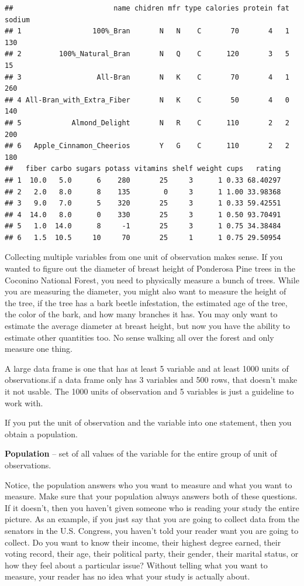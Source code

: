 \documentclass[]{book}
\begin{document}
\begin{verbatim}
##                        name chidren mfr type calories protein fat sodium
## 1                 100%_Bran       N   N    C       70       4   1    130
## 2         100%_Natural_Bran       N   Q    C      120       3   5     15
## 3                  All-Bran       N   K    C       70       4   1    260
## 4 All-Bran_with_Extra_Fiber       N   K    C       50       4   0    140
## 5            Almond_Delight       N   R    C      110       2   2    200
## 6   Apple_Cinnamon_Cheerios       Y   G    C      110       2   2    180
##   fiber carbo sugars potass vitamins shelf weight cups   rating
## 1  10.0   5.0      6    280       25     3      1 0.33 68.40297
## 2   2.0   8.0      8    135        0     3      1 1.00 33.98368
## 3   9.0   7.0      5    320       25     3      1 0.33 59.42551
## 4  14.0   8.0      0    330       25     3      1 0.50 93.70491
## 5   1.0  14.0      8     -1       25     3      1 0.75 34.38484
## 6   1.5  10.5     10     70       25     1      1 0.75 29.50954
\end{verbatim}

Collecting multiple variables from one unit of observation makes sense. If you wanted to figure out the diameter of breast height of Ponderosa Pine trees in the Coconino National Forest, you need to physically measure a bunch of trees. While you are measuring the diameter, you might also want to measure the height of the tree, if the tree has a bark beetle infestation, the estimated age of the tree, the color of the bark, and how many branches it has. You may only want to estimate the average diameter at breast height, but now you have the ability to estimate other quantities too. No sense walking all over the forest and only measure one thing.

A large data frame is one that has at least 5 variable and at least 1000 units of observations.if a data frame only has 3 variables and 500 rows, that doesn't make it not usable. The 1000 units of observation and 5 variables is just a guideline to work with.

If you put the unit of observation and the variable into one statement, then you obtain a population.

\textbf{Population} -- set of all values of the variable for the entire group of unit of observations.

Notice, the population answers who you want to measure and what you want to measure. Make sure that your population always answers both of these questions. If it doesn't, then you haven't given someone who is reading your study the entire picture. As an example, if you just say that you are going to collect data from the senators in the U.S. Congress, you haven't told your reader want you are going to collect. Do you want to know their income, their highest degree earned, their voting record, their age, their political party, their gender, their marital status, or how they feel about a particular issue? Without telling what you want to measure, your reader has no idea what your study is actually about.
\end{document}
